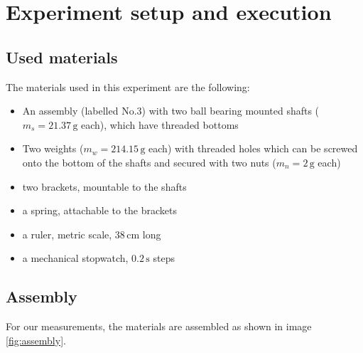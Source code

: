 \documentclass{scrreprt}
\newcommand{\unit}[1]{\ensuremath{\, \mathrm{#1}}}
\begin{document}
\section{Experiment setup and execution}

\subsection{Used materials}
The materials used in this experiment are the following:
\begin{itemize}
\item An assembly (labelled No.$3$) with two ball bearing mounted shafts ($m_s = 21.37\unit{g}$ each), which have threaded bottoms
\item Two weights ($m_w = 214.15 \unit{g}$ each) with threaded holes which can be screwed onto the bottom of the shafts and secured with two nuts ($m_n = 2\unit{g}$ each)
\item two brackets, mountable to the shafts
\item a spring, attachable to the brackets 
\item a ruler, metric scale, $38 \unit{cm}$ long
\item a mechanical stopwatch, $0.2 \unit{s}$ steps
\end{itemize}

\subsection{Assembly}
For our measurements, the materials are assembled as shown in image \ref{fig:assembly}.
\end{document}
